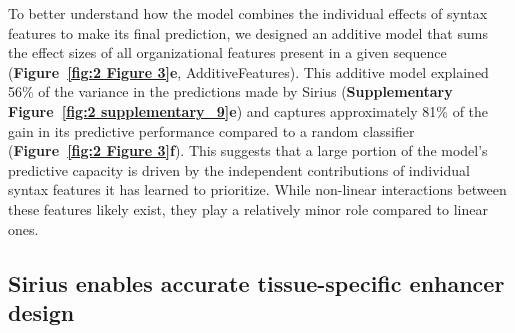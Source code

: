 To better understand how the model combines the individual effects of syntax features to make its final prediction, we designed an additive model that sums the effect sizes of all organizational features present in a given sequence (\textbf{Figure~\ref{fig:2 Figure 3}e}, AdditiveFeatures). This additive model explained 56\% of the variance in the predictions made by Sirius (\textbf{Supplementary Figure~\ref{fig:2 supplementary_9}e}) and captures approximately 81\% of the gain in its predictive performance compared to a random classifier (\textbf{Figure~\ref{fig:2 Figure 3}f}). This suggests that a large portion of the model’s predictive capacity is driven by the independent contributions of individual syntax features it has learned to prioritize. While non-linear interactions between these features likely exist, they play a relatively minor role compared to linear ones.

\subsection{Sirius enables accurate tissue-specific enhancer design}

